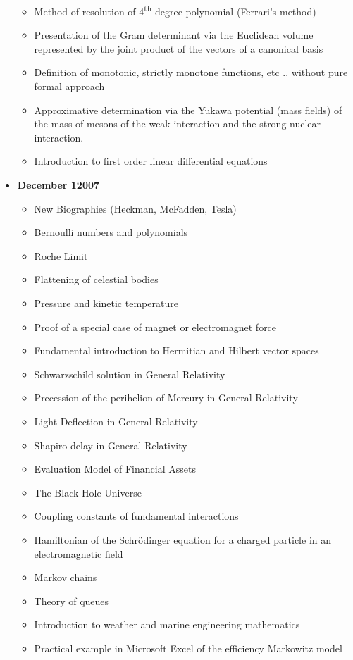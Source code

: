 \begin{itemize}
\begin{itemize}[noitemsep]
			\item Method of resolution of 4\textsuperscript{th} degree polynomial (Ferrari's method)
			\item Presentation of the Gram determinant via the Euclidean volume represented by the joint product of the vectors of a canonical basis
			\item Definition of monotonic, strictly monotone functions, etc .. without pure formal approach
			\item Approximative determination via the Yukawa potential (mass fields) of the mass of mesons of the weak interaction and the strong nuclear interaction.
			\item Introduction to first order linear differential equations			
		\end{itemize}
	\item \textbf{December 12007}
		\begin{itemize}[noitemsep]
			\item New Biographies (Heckman, McFadden, Tesla)
			\item Bernoulli numbers and polynomials
			\item Roche Limit
			\item Flattening of celestial bodies
			\item Pressure and kinetic temperature
			\item Proof of a special case of magnet or electromagnet force
			\item Fundamental introduction to Hermitian and Hilbert vector spaces 
			\item Schwarzschild solution in General Relativity
			\item Precession of the perihelion of Mercury in General Relativity
			\item Light Deflection in General Relativity
			\item Shapiro delay in General Relativity
			\item Evaluation Model of Financial Assets
			\item The Black Hole Universe
			\item Coupling constants of fundamental interactions
			\item Hamiltonian of the Schrödinger equation for a charged particle in an electromagnetic field
			\item Markov chains
			\item Theory of queues
			\item Introduction to weather and marine engineering mathematics
			\item Practical example in Microsoft Excel of the efficiency Markowitz model

\end{itemize}
\end{itemize}
